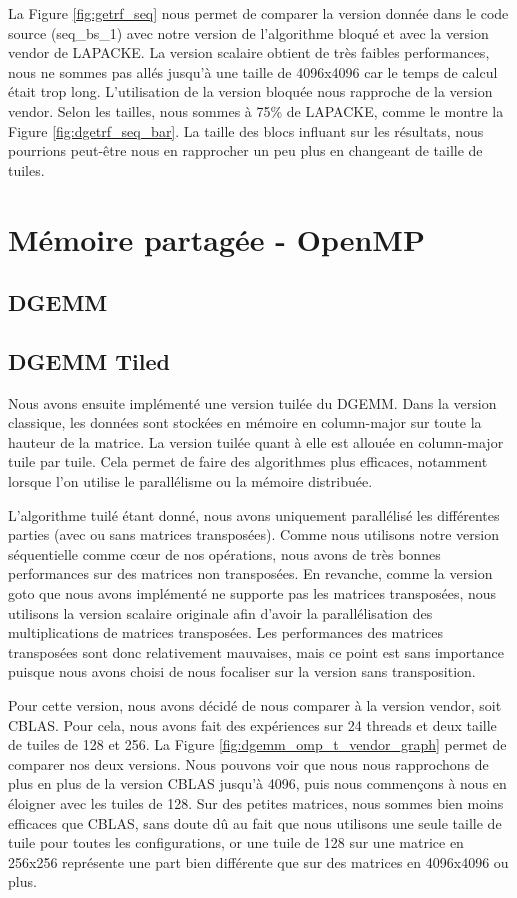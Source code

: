 \documentclass[10pt, a4paper]{IEEEtran}
\begin{document}
La Figure \ref{fig:getrf_seq} nous permet de comparer la version donnée dans le code source (seq\_bs\_1) avec notre version de l'algorithme bloqué et avec la version vendor de LAPACKE.
La version scalaire obtient de très faibles performances, nous ne sommes pas allés jusqu'à une taille de 4096x4096 car le temps de calcul était trop long.
L'utilisation de la version bloquée nous rapproche de la version vendor. Selon les tailles, nous sommes à 75\% de LAPACKE, comme le montre la Figure \ref{fig:dgetrf_seq_bar}.
La taille des blocs influant sur les résultats, nous pourrions peut-être nous en rapprocher un peu plus en changeant de taille de tuiles.

\section{Mémoire partagée - OpenMP}
\subsection{DGEMM}\label{part:omp}

\subsection{DGEMM Tiled}\label{dgemm_omp_tiled}
Nous avons ensuite implémenté une version tuilée du DGEMM. Dans la version classique, les données sont stockées en mémoire en
column-major sur toute la hauteur de la matrice. La version tuilée quant à elle est allouée
en column-major tuile par tuile.
Cela permet de faire des algorithmes plus efficaces, notamment lorsque l'on utilise le parallélisme ou la mémoire distribuée.

L'algorithme tuilé étant donné, nous avons uniquement parallélisé les différentes parties (avec ou sans matrices transposées).
Comme nous utilisons notre version séquentielle comme cœur de nos opérations, nous avons de très bonnes performances sur des matrices non transposées.
En revanche, comme la version goto que nous avons implémenté ne supporte pas les matrices transposées, nous utilisons la version scalaire originale
afin d'avoir la parallélisation des multiplications de matrices transposées. Les performances des matrices transposées sont donc relativement mauvaises,
mais ce point est sans importance puisque nous avons choisi de nous focaliser sur la version sans transposition.

Pour cette version, nous avons décidé de nous comparer à la version vendor, soit CBLAS. Pour cela, nous avons fait des expériences sur 24 threads et deux taille de tuiles de 128 et 256.
La Figure \ref{fig:dgemm_omp_t_vendor_graph} permet de comparer nos deux versions. Nous pouvons voir que nous nous rapprochons de plus en plus de la version CBLAS
jusqu'à 4096, puis nous commençons à nous en éloigner avec les tuiles de 128. Sur des petites matrices, nous sommes bien moins efficaces que CBLAS, sans doute dû au fait que nous utilisons une seule taille de tuile pour toutes
les configurations, or une tuile de 128 sur une matrice en 256x256 représente une part bien différente que sur des matrices en 4096x4096 ou plus.
\end{document}
